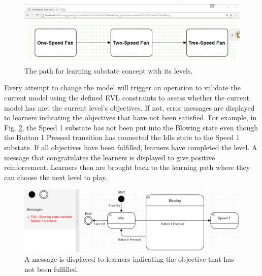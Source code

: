 \documentclass[conference]{IEEEtran}
\begin{document}
\begin{figure}[!t]
\centering
\includegraphics[width=\linewidth]{path}
\caption{The path for learning substate concept with its levels.}
\label{path}
\end{figure}    

Every attempt to change the model will trigger an operation to validate the current model using the defined EVL constraints to assess whether the current model has met the current level's objectives. If not, error messages are displayed to learners indicating the objectives that have not been satisfied. For example, in Fig. \ref{example-fail-messages}, the Speed 1 substate has not been put into the Blowing state even though the Button 1 Pressed transition has connected the Idle state to the Speed 1 substate. If all objectives have been fulfilled, learners have completed the level. A message that congratulates the learners is displayed to give positive reinforcement. Learners then are brought back to the learning path where they can choose the next level to play.  

\begin{figure}[!t]
\centering
\includegraphics[width=\linewidth]{example-fail-messages}
\caption{A message is displayed to learners indicating the objective that has not been fulfilled.}
\label{example-fail-messages}
\end{figure}  
\end{document}
